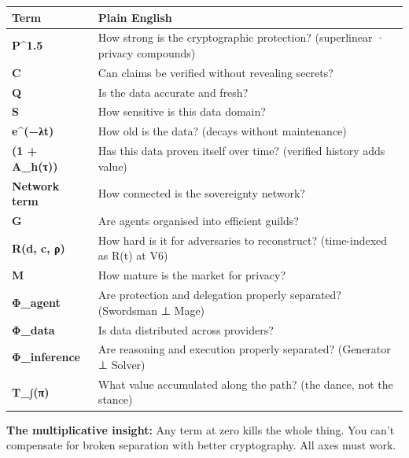 \documentclass[
]{article}
\newcounter{none} %
\begin{document}
{\def\LTcaptype{none} %
\begin{longtable}[]{@{}
  >{\raggedright\arraybackslash}p{}
  >{\raggedright\arraybackslash}p{}@{}}
\toprule\noalign{}
\begin{minipage}[b]{\linewidth}\raggedright
Term
\end{minipage} & \begin{minipage}[b]{\linewidth}\raggedright
Plain English
\end{minipage} \\
\midrule\noalign{}
\endhead
\bottomrule\noalign{}
\endlastfoot
\textbf{P\^{}1.5} & How strong is the cryptographic protection?
(superlinear · privacy compounds) \\
\textbf{C} & Can claims be verified without revealing secrets? \\
\textbf{Q} & Is the data accurate and fresh? \\
\textbf{S} & How sensitive is this data domain? \\
\textbf{e\^{}(−λt)} & How old is the data? (decays without
maintenance) \\
\textbf{(1 + A\_h(τ))} & Has this data proven itself over time?
(verified history adds value) \\
\textbf{Network term} & How connected is the sovereignty network? \\
\textbf{G} & Are agents organised into efficient guilds? \\
\textbf{R(d, c, ρ)} & How hard is it for adversaries to reconstruct?
(time-indexed as R(t) at V6) \\
\textbf{M} & How mature is the market for privacy? \\
\textbf{Φ\_agent} & Are protection and delegation properly separated?
(Swordsman ⊥ Mage) \\
\textbf{Φ\_data} & Is data distributed across providers? \\
\textbf{Φ\_inference} & Are reasoning and execution properly separated?
(Generator ⊥ Solver) \\
\textbf{T\_∫(π)} & What value accumulated along the path? (the dance,
not the stance) \\
\end{longtable}
}

\textbf{The multiplicative insight:} Any term at zero kills the whole
thing. You can't compensate for broken separation with better
cryptography. All axes must work.
\end{document}
